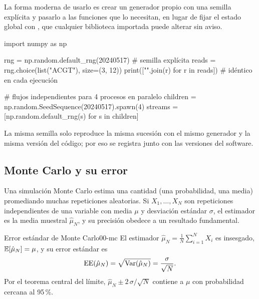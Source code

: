 La forma moderna de usarlo es crear un generador propio con una semilla explícita y pasarlo a las funciones que lo necesitan, en lugar de fijar el estado global con , que cualquier biblioteca importada puede alterar sin aviso.

\begin{codigo}[semillas.py]
import numpy as np

rng = np.random.default_rng(20240517)          # semilla explícita
reads = rng.choice(list("ACGT"), size=(3, 12))
print(["".join(r) for r in reads])             # idéntico en cada ejecución

# flujos independientes para 4 procesos en paralelo
children = np.random.SeedSequence(20240517).spawn(4)
streams = [np.random.default_rng(s) for s in children]
\end{codigo}

La misma semilla solo reproduce la misma sucesión con el mismo generador y la misma versión del código; por eso se registra junto con las versiones del software.

\subsection{Monte Carlo y su error}

Una simulación Monte Carlo estima una cantidad (una probabilidad, una media) promediando muchas repeticiones aleatorias. Si $X_1,\ldots,X_N$ son repeticiones independientes de una variable con media $\mu$ y desviación estándar $\sigma$, el estimador es la media muestral $\hat\mu_N$, y su precisión obedece a un resultado fundamental.

\begin{teorema}{Error estándar de Monte Carlo}{00-mc}
El estimador $\hat\mu_N = \frac1N\sum_{i=1}^{N}X_i$ es insesgado, $\mathbb{E}[\hat\mu_N]=\mu$, y su error estándar es
\begin{equation}\label{eq:00-mc}
\operatorname{EE}(\hat\mu_N) = \sqrt{\operatorname{Var}(\hat\mu_N)} = \frac{\sigma}{\sqrt{N}} .
\end{equation}
Por el teorema central del límite, $\hat\mu_N \pm 2\,\sigma/\sqrt N$ contiene a $\mu$ con probabilidad cercana al 95\,\%.
\end{teorema}

\begin{simbolos}
\end{simbolos}

